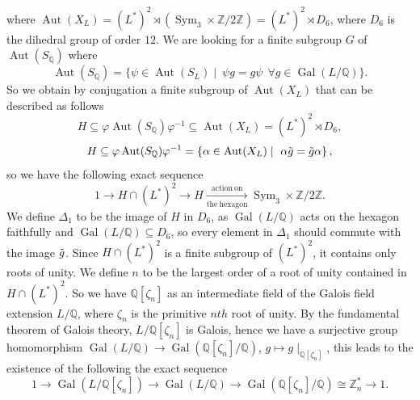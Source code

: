 \documentclass[leqno,12pt]{amsart} %
\newcommand{\Z}{\ensuremath{\mathbb{Z}}}
\newcommand{\Q}{\ensuremath{\mathbb{Q} }}
\DeclareMathOperator{\Aut}{Aut}
\DeclareMathOperator{\Gal}{Gal}
\DeclareMathOperator{\sym}{Sym}
\begin{document}
where $\Aut(X_L)=\left(L^{*} \right)^2\rtimes(\sym_3 \times \Z /2 \Z )=\left(L^{*}\right)^2\rtimes D_6$, where $D_6$ is the dihedral group of order $12$.  We are looking for a finite subgroup $G$ of $\Aut(S_{\Q })$ where
\begin{equation*}
    \Aut(S_{\Q })= \{\psi\in \Aut(S_{L})\mid  ~\psi g=g\psi ~~\forall g\in \Gal(L/\Q )\}.
\end{equation*}
So we obtain by conjugation a finite subgroup of $\Aut(X_L)$ that can be described as follows
\[H\subseteq \varphi \Aut(S_{\Q })\varphi^{-1}\subseteq \Aut(X_{L})=\left(L^{*}\right)^2\rtimes D_6,\]
\begin{equation*}
H\subseteq \varphi \Aut(S_{\Q })\varphi^{-1}=\left\{\alpha\in \Aut(X_{L})\mid ~\alpha \Tilde{g}= \Tilde{g} \alpha\right\},
\end{equation*}
so we have the following exact sequence
\begin{equation}\label{lemm-13}
1 \stackrel{~ }{\rightarrow} H\cap\left(L^{*}\right)^2\stackrel{~ }{\rightarrow} H\xrightarrow[\mathrm{the~hexagon}]{\mathrm{action~on}} \sym_3\times \Z /2\Z .
\end{equation}
We define $\Delta_1$ to be the image of $H$ in $D_6$, as $\Gal(L/\Q )$ acts on the hexagon faithfully and $\Gal(L/\Q )\subseteq D_6$, so every element in $\Delta_1$ should commute with the image $\Tilde{g}$. Since $H \cap (L^*)^2$ is a finite subgroup of  $(L^*)^2$, it contains only roots of unity. We define $n$ to be the largest order of a root of unity contained in $H \cap (L^*)^2$. So we have $\Q [\zeta_n]$ as an intermediate field of the Galois field extension $L/\Q $, where $\zeta_n$ is the primitive $nth$ root of unity. By the fundamental theorem of Galois theory, $L/\Q [\zeta_n]$ is Galois, hence we have a surjective group homomorphism $\Gal(L/\Q )\rightarrow \Gal(\Q [\zeta_n]/\Q )$, $g\mapsto g\mid _{\Q [\zeta_n]}$, this leads to the existence of the following the exact sequence 
\begin{equation}\label{Gal:exact}
    1\rightarrow \Gal(L/\Q [\zeta_n])\rightarrow \Gal(L/\Q )\rightarrow \Gal(\Q [\zeta_n]/\Q )\cong \Z^*_{n}\rightarrow 1.\end{equation}
\end{document}
